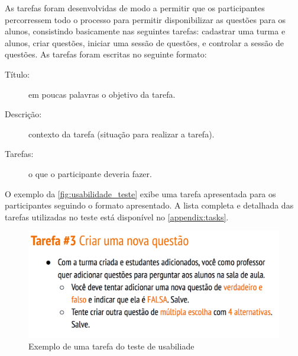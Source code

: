 As tarefas foram desenvolvidas de modo a permitir que os participantes
percorressem todo o processo para permitir disponibilizar as questões para os alunos,
consistindo basicamente nas seguintes tarefas: cadastrar uma turma e alunos, criar questões, iniciar uma sessão de questões,
e controlar a sessão de questões. As tarefas foram escritas no seguinte formato:

\begin{description}
  \item[Título:] em poucas palavras o objetivo da tarefa.
  \item[Descrição:] contexto da tarefa (situação para realizar a tarefa).
  \item[Tarefas:] o que o participante deveria fazer.
\end{description}

O exemplo da \autoref{fig:usabilidade_teste} exibe uma tarefa apresentada para
os participantes seguindo o formato apresentado. A lista completa e detalhada das tarefas
utilizadas no teste está disponível no \autoref{appendix:tasks}.

\begin{figure}[!ht]
  \centering
  \caption{Exemplo de uma tarefa do teste de usabiliade}
  \label{fig:usabilidade_teste}
  \includegraphics[scale=0.35]{imagens/usability_task}
  \doautor
\end{figure}

